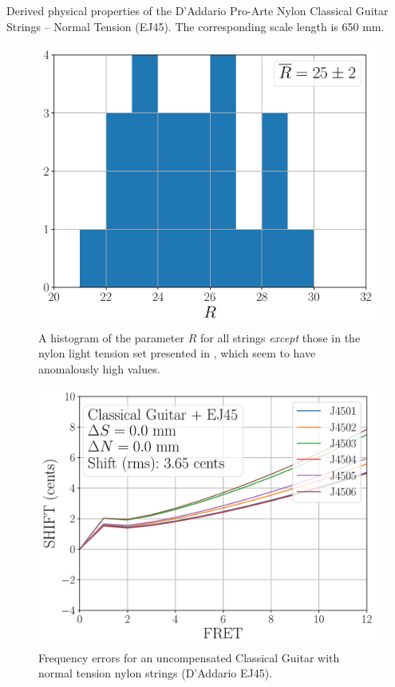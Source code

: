 \begin{table}%
  \centering
  \caption{\label{tbl:ej45_props} Derived physical properties of the D'Addario Pro-Arte Nylon Classical Guitar Strings -- Normal Tension (EJ45). The corresponding scale length is 650 mm.}
  
\end{table}%

\begin{figure}
  \centering
  \includegraphics[width=5.0in]{figures/hist_r}
  \caption{\label{fig:hist_r} A histogram of the parameter $R$ for all strings \emph{except} those in the nylon light tension set presented in , which seem to have anomalously high values.}
\end{figure}

\begin{figure}
  \centering
  \includegraphics[width=5.0in]{figures/shift_classicalguitar_ej45_null}
  \caption{\label{fig:shift_classicalguitar_ej45_null} Frequency errors for an uncompensated Classical Guitar with normal tension nylon strings (D'Addario EJ45).}
\end{figure}

